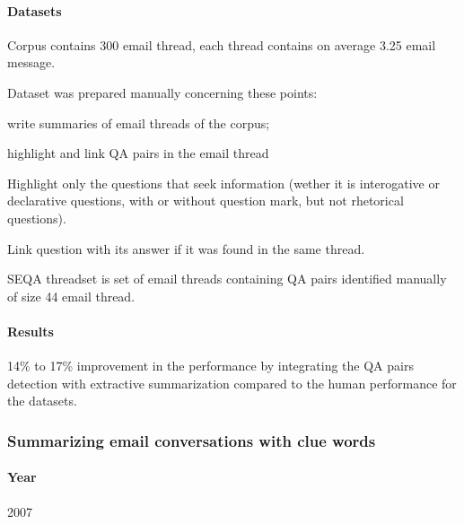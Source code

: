 \documentclass[12pt]{article}
\newenvironment{my_itemize}
{\begin{itemize}
  \setlength{\itemsep}{0cm}
  \setlength{\parskip}{0cm}}
{\end{itemize}}
\begin{document}
\paragraph{Datasets}
\begin{my_itemize}
  \item Corpus contains 300 email thread, each thread contains on average 3.25 email message.
  \item Dataset was prepared manually concerning these points:
  \begin{my_itemize}
    \item write summaries of email threads of the corpus;
    \item highlight and link QA pairs in the email thread
    \begin{my_itemize}
      \item Highlight only the questions that seek information (wether it is 
	    interogative or declarative questions, with or without question mark, 
	    but not rhetorical questions).
      \item Link question with its answer if it was found in the same thread.
    \end{my_itemize}
  \end{my_itemize}
  \item SEQA threadset is set of email threads containing QA pairs identified manually of size 44 email thread.
\end{my_itemize}

\paragraph{Results}
\begin{my_itemize}
  \item 14\% to 17\% improvement in the performance by integrating the QA pairs 
	detection with extractive summarization compared to the human performance
	for the datasets.
\end{my_itemize}


\subsubsection{Summarizing email conversations with clue words \cite{GIUSEPPE07}}

\paragraph{Year} 2007
\end{document}
